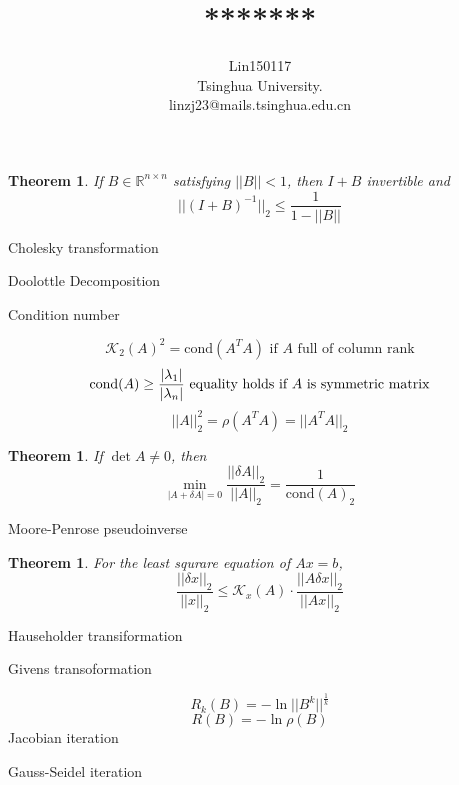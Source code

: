 \documentclass[12pt,b5paper,notitlepage]{article}
\title{*******}
\author{{\sc Lin150117}
	\\
	{\small \sc Tsinghua University.}\\
	{\small linzj23@mails.tsinghua.edu.cn}
}
\theoremstyle{definition}
\theoremstyle{remark}
\theoremstyle{plain}
\newtheorem{theorem}[definition]{Theorem}
\newcommand{\cond}{\mathrm{cond}}
\numberwithin{equation}{section}
\renewcommand{\|}{\Vert}
\begin{document}
\sloppy
{}
\maketitle
\tableofcontents
\newpage

\begin{theorem}
    If  $ B\in\mathbb{R}^{n\times n} $ satisfying  $ ||B||<1 $, then  $ I+B  $ invertible and 
    \[||(I+B)^{-1}||_2 \leq \frac{1}{1-||B||}\]   
\end{theorem}
Cholesky transformation

Doolottle Decomposition

Condition number

\[\mathcal{K}_2(A)^2=\cond(A^TA)\text{ if }A\text{ full of column rank}\]
\[\cond(A) \geq \frac{|\lambda_1|}{|\lambda_n|}\text{ equality holds if  $ A $ is symmetric matrix}\]
\[||A||_2^2=\rho(A^TA)=||A^TA||_2\]
\begin{theorem}
    If  $ \det A\not=0 $, then 
    \[\min_{|A+\delta A|=0}\frac{||\delta A||_2}{||A||_2}=\frac{1}{\cond(A)_2}\] 
\end{theorem}
Moore-Penrose pseudoinverse

\begin{theorem}
    For the least squrare equation of  $ Ax=b $, 
    \[\frac{||\delta x||_2}{||x||_2} \leq \mathcal{K}_x(A)\cdot\frac{||A\delta x||_2}{||Ax||_2}\] 
\end{theorem}
Hauseholder transiformation

Givens transoformation

\[R_k(B)=-\ln ||B^k||^{\frac{1}{k}}\]
\[R(B)=-\ln \rho(B)\]
Jacobian iteration

Gauss-Seidel iteration
\end{document}
